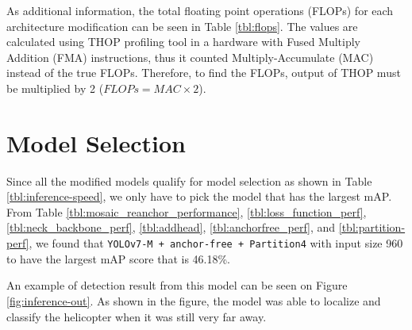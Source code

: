 As additional information, the total floating point operations (FLOPs) for each architecture modification can be seen in Table \ref{tbl:flops}.
The values are calculated using THOP profiling tool in a hardware with Fused Multiply Addition (FMA) instructions, thus it counted Multiply-Accumulate (MAC) instead of the true FLOPs.
Therefore, to find the FLOPs, output of THOP must be multiplied by 2 ($FLOPs = MAC \times 2$).

\begin{table}
  \centering
  \label{tbl:inference-speed}
  \vspace{-1ex}
  \begin{adjustbox}{width=\textwidth}
  
  \end{adjustbox}
\end{table}
\begin{table}
  \centering
  \label{tbl:flops}
  \vspace{-1ex}
  \begin{adjustbox}{width=.8\textwidth}
  
  \end{adjustbox}
\end{table}

\section{Model Selection}
Since all the modified models qualify for model selection as shown in Table \ref{tbl:inference-speed},
we only have to pick the model that has the largest mAP.
From Table \ref{tbl:mosaic_reanchor_performance}, \ref{tbl:loss_function_perf}, \ref{tbl:neck_backbone_perf}, \ref{tbl:addhead}, \ref{tbl:anchorfree_perf}, and \ref{tbl:partition-perf},
we found that \texttt{YOLOv7-M + anchor-free + Partition4} with input size 960 to have the largest
mAP score that is 46.18\%.

An example of detection result from this model can be seen on Figure \ref{fig:inference-out}.
As shown in the figure, the model was able to localize and classify the helicopter when it was still very far away.

